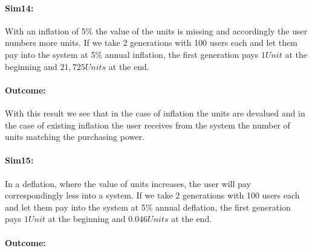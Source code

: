 \paragraph{Sim14:} 
With an inflation of 5\% the value of the units is missing and accordingly the user numbers more units. If we take 2 generations with 100 users each and let them pay into the system at 5\% annual inflation, the first generation pays $1 Unit$ at the beginning and $21,725 Units$ at the end. 

\paragraph{Outcome:}

\begin{table}[hbt!]
\centering
{}
\end{table}

With this result we see that in the case of inflation the units are devalued and in the case of existing inflation the user receives from the system the number of units matching the purchasing power.

\paragraph{Sim15:} In a deflation, where the value of units increases, the user will pay correspondingly less into a system. If we take 2 generations with 100 users each and let them pay into the system at 5\% annual deflation, the first generation pays $1 Unit$ at the beginning and $0.046 Units$ at the end. 

\paragraph{Outcome:}

